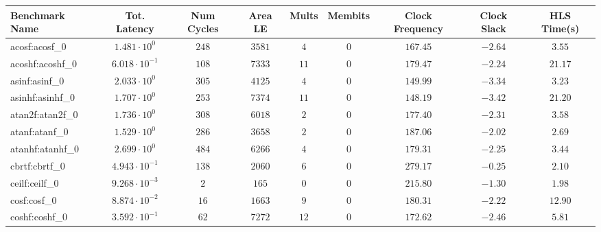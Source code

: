 \begin{tabular}{|l|c|c|c|c|c|c|c|c|}
\hline
Benchmark Name               & Tot. Latency            & Num Cycles & Area LE    & Mults   & Membits & Clock Frequency & Clock Slack & HLS Time(s) \\
\hline
acosf:acosf\_0               & $ 1.481 \cdot 10^{0}  $ & $ 248    $ & $ 3581   $ & $ 4   $ & $ 0   $ & $ 167.45      $ & $ -2.64   $ & $ 3.55    $ \\
acoshf:acoshf\_0             & $ 6.018 \cdot 10^{-1} $ & $ 108    $ & $ 7333   $ & $ 11  $ & $ 0   $ & $ 179.47      $ & $ -2.24   $ & $ 21.17   $ \\
asinf:asinf\_0               & $ 2.033 \cdot 10^{0}  $ & $ 305    $ & $ 4125   $ & $ 4   $ & $ 0   $ & $ 149.99      $ & $ -3.34   $ & $ 3.23    $ \\
asinhf:asinhf\_0             & $ 1.707 \cdot 10^{0}  $ & $ 253    $ & $ 7374   $ & $ 11  $ & $ 0   $ & $ 148.19      $ & $ -3.42   $ & $ 21.20   $ \\
atan2f:atan2f\_0             & $ 1.736 \cdot 10^{0}  $ & $ 308    $ & $ 6018   $ & $ 2   $ & $ 0   $ & $ 177.40      $ & $ -2.31   $ & $ 3.58    $ \\
atanf:atanf\_0               & $ 1.529 \cdot 10^{0}  $ & $ 286    $ & $ 3658   $ & $ 2   $ & $ 0   $ & $ 187.06      $ & $ -2.02   $ & $ 2.69    $ \\
atanhf:atanhf\_0             & $ 2.699 \cdot 10^{0}  $ & $ 484    $ & $ 6266   $ & $ 4   $ & $ 0   $ & $ 179.31      $ & $ -2.25   $ & $ 3.44    $ \\
cbrtf:cbrtf\_0               & $ 4.943 \cdot 10^{-1} $ & $ 138    $ & $ 2060   $ & $ 6   $ & $ 0   $ & $ 279.17      $ & $ -0.25   $ & $ 2.10    $ \\
ceilf:ceilf\_0               & $ 9.268 \cdot 10^{-3} $ & $ 2      $ & $ 165    $ & $ 0   $ & $ 0   $ & $ 215.80      $ & $ -1.30   $ & $ 1.98    $ \\
cosf:cosf\_0                 & $ 8.874 \cdot 10^{-2} $ & $ 16     $ & $ 1663   $ & $ 9   $ & $ 0   $ & $ 180.31      $ & $ -2.22   $ & $ 12.90   $ \\
coshf:coshf\_0               & $ 3.592 \cdot 10^{-1} $ & $ 62     $ & $ 7272   $ & $ 12  $ & $ 0   $ & $ 172.62      $ & $ -2.46   $ & $ 5.81    $ \\

\end{tabular}

